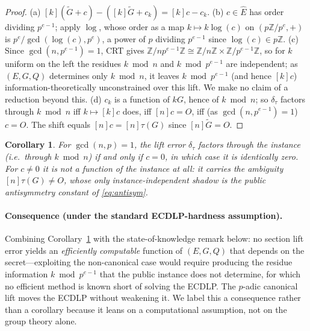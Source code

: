 \documentclass[11pt]{article}
\newtheorem{corollary}{Corollary}
\theoremstyle{definition}
\newcommand{\Z}{\mathbb{Z}}
\newcommand{\Ehat}{\widehat{E}}
\begin{document}
\begin{proof}
(a) $[k](\widetilde G+c)-([k]\widetilde G+c_k)=[k]c-c_k$. (b) $c\in\Ehat$
has order dividing $p^{e-1}$; apply $\log$, whose order as a map
$k\mapsto k\log(c)$ on $(p\Z/p^e,+)$ is $p^e/\gcd(\log(c),p^e)$, a power
of $p$ dividing $p^{e-1}$ since $\log(c)\in p\Z$. (c) Since
$\gcd(n,p^{e-1})=1$, CRT gives $\Z/np^{e-1}\Z\cong\Z/n\Z\times\Z/p^{e-1}\Z$,
so for $k$ uniform on the left the residues $k\bmod n$ and $k\bmod
p^{e-1}$ are independent; as $(E,G,Q)$ determines only $k\bmod n$, it
leaves $k\bmod p^{e-1}$ (and hence $[k]c$) information-theoretically
unconstrained over this lift. We make no claim of a reduction beyond
this. (d) $c_k$ is a function of $kG$, hence of
$k\bmod n$; so $\delta_\tau$ factors through $k\bmod n$ iff
$k\mapsto[k]c$ does, iff $[n]c=O$, iff (as $\gcd(n,p^{e-1})=1$) $c=O$. The
shift equals $[n]c=[n]\tau(G)$ since $[n]\widetilde G=O$.
\end{proof}

\begin{corollary}\label{cor:main}
For $\gcd(n,p)=1$, the lift error $\delta_\tau$ factors through the
instance (i.e.\ through $k\bmod n$) if and only if $c=0$, in which case
it is identically zero. For $c\neq0$ it is not a function of the
instance at all: it carries the ambiguity $[n]\tau(G)\neq O$, whose only
instance-independent shadow is the public antisymmetry constant of
\eqref{eq:antisym}.
\end{corollary}

\paragraph{Consequence (under the standard ECDLP-hardness assumption).}
Combining Corollary~\ref{cor:main} with the state-of-knowledge remark
below: no section lift error yields an \emph{efficiently computable}
function of $(E,G,Q)$ that depends on the secret---exploiting the
non-canonical case would require producing the residue information
$k\bmod p^{e-1}$ that the public instance does not determine, for which
no efficient method is known short of solving the ECDLP. The $p$-adic
canonical lift moves the ECDLP without weakening it. We label this a
consequence rather than a corollary because it leans on a computational
assumption, not on the group theory alone.
\end{document}
